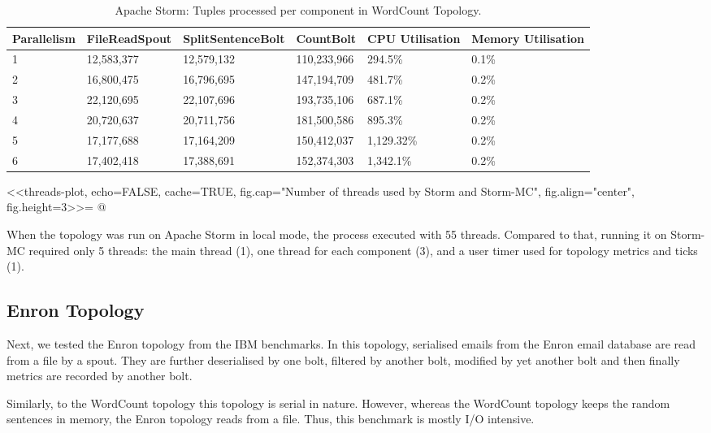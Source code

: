 \medskip
\begin{table}
\begin{adjustwidth}{-0.5in}{-0.5in}
\centering
\small
\begin{tabular}{@{}llllll@{}}
    {Parallelism} & {FileReadSpout} & {SplitSentenceBolt} & {CountBolt} & {CPU Utilisation} & {Memory Utilisation} \\ \toprule
    1 & {12,583,377} & {12,579,132} & {110,233,966} & {294.5\%} & {0.1\%} \\
    2 & {16,800,475} & {16,796,695} & {147,194,709} & {481.7\%} & {0.2\%} \\
    3 & {22,120,695} & {22,107,696} & {193,735,106} & {687.1\%} & {0.2\%} \\
    4 & {20,720,637} & {20,711,756} & {181,500,586} & {895.3\%} & {0.2\%} \\
	5 & {17,177,688} & {17,164,209} & {150,412,037} & {1,129.32\%} & {0.2\%} \\
	6 & {17,402,418} & {17,388,691} & {152,374,303} & {1,342.1\%} & {0.2\%} \\
\end{tabular}
\caption{Apache Storm: Tuples processed per component in WordCount Topology.}
\end{adjustwidth}
\label{table:storm_wordcount}
\end{table}
\medskip

<<threads-plot, echo=FALSE, cache=TRUE, fig.cap="Number of threads used by Storm and Storm-MC", fig.align="center", fig.height=3>>=
@


When the topology was run on Apache Storm in local mode, the process executed with 55 threads. Compared to that, running it on Storm-MC required only 5 threads: the main thread (1), one thread for each component (3), and a user timer used for topology metrics and ticks (1).

\subsection{Enron Topology}

Next, we tested the Enron topology from the IBM benchmarks. In this topology, serialised emails from the Enron email database are read from a file by a spout. They are further deserialised by one bolt, filtered by another bolt, modified by yet another bolt and then finally metrics are recorded by another bolt.

Similarly, to the WordCount topology this topology is serial in nature. However, whereas the WordCount topology keeps the random sentences in memory, the Enron topology reads from a file. Thus, this benchmark is mostly I/O intensive.


